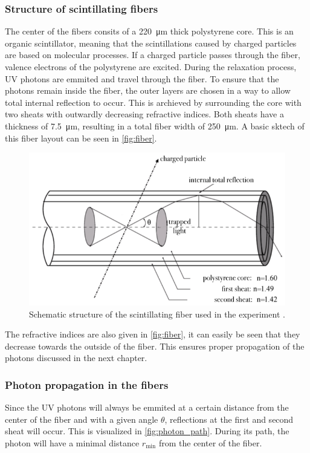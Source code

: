 \subsubsection{Structure of scintillating fibers}

The center of the fibers consits of a \qty{220}{\micro\meter} thick polystyrene core. This is an organic scintillator,
meaning that the scintillations caused by charged particles are based on molecular processes. If a charged particle
passes through the fiber, valence electrons of the polystyrene are excited. During the relaxation process, UV photons
are emmited and travel through the fiber. To ensure that the photons remain inside the fiber, the outer layers are chosen
in a way to allow total internal reflection to occur. This is archieved by surrounding the core with two sheats with
outwardly decreasing refractive indices. Both sheats have a thickness of \qty{7.5}{\micro\meter}, resulting in a total fiber width
of \qty{250}{\micro\meter}. A basic sktech of this fiber layout can be seen in \autoref{fig:fiber}.

\begin{figure}[H]
	\centering
	\includegraphics[width=0.7\linewidth]{pics/fiber.png}
	\caption{Schematic structure of the scintillating fiber used in the experiment \cite{SciFi}.}
	\label{fig:fiber}
\end{figure}

The refractive indices are also given in \autoref{fig:fiber}, it can easily be seen that they decrease towards the outside
of the fiber. This ensures proper propagation of the photons discussed in the next chapter.

\subsubsection{Photon propagation in the fibers}
\label{sec:prop}

Since the UV photons will always be emmited at a certain distance from the center of the fiber and with a given angle $\theta$,
reflections at the first and second sheat will occur. This is visualized in \autoref{fig:photon_path}.
During its path, the photon will have a minimal distance $r_\mathrm{min}$ from the center of the fiber.

